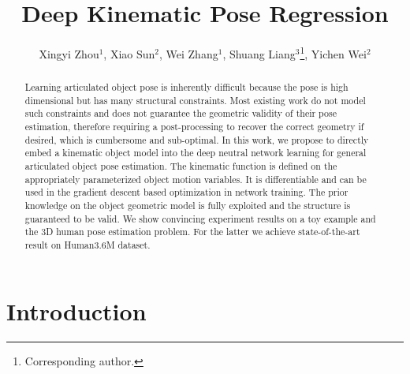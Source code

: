 \documentclass[runningheads]{llncs}
\begin{document}
\pagestyle{headings}
\mainmatter

\title{Deep Kinematic Pose Regression} 



\author{Xingyi Zhou$^1$, Xiao Sun$^2$, Wei Zhang$^1$,  Shuang Liang$^3$\thanks{Corresponding author.}, Yichen Wei$^2$}




\maketitle

\begin{abstract}
Learning articulated object pose is inherently difficult because the pose is high dimensional but has many structural constraints. Most existing work do not model such constraints and does not guarantee the geometric validity of their pose estimation, therefore requiring a post-processing to recover the correct geometry if desired, which is cumbersome and sub-optimal. In this work, we propose to directly embed a kinematic object model into the deep neutral network learning for general articulated object pose estimation. The kinematic function is defined on the appropriately parameterized object motion variables. It is differentiable and can be used in the gradient descent based optimization in network training. The prior knowledge on the object geometric model is fully exploited and the structure is guaranteed to be valid. We show convincing experiment results on a toy example and the 3D human pose estimation problem. For the latter we achieve state-of-the-art result on Human3.6M dataset.
\end{abstract}


\section{Introduction}
\end{document}
